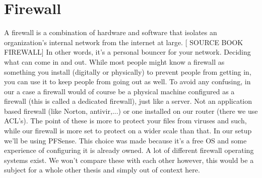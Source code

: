 \section{Firewall}
A firewall is a combination of hardware and software that isolates an organization's internal network from the internet at large. [ SOURCE BOOK FIREWALL] In other words, it's a personal bouncer for your network. Deciding what can come in and out. While most people might know a firewall as something you install (digitally or physically) to prevent people from getting in, you can use it to keep people from going out as well. To avoid any confusing, in our a case a firewall would of course be a physical machine configured as a firewall (this is called a dedicated firewall), just like a server. Not an application based firewall (like Norton, antivir,...) or one installed on our router (there we use ACL's). The point of these is more to protect your files from viruses and such, while our firewall is more set to protect on a wider scale than that. In our setup we'll be using PFSense. This choice was made because it's a free OS and some experience of configuring it is already owned. A lot of different firewall operating systems exist. We won't compare these with each other however, this would be a subject for a whole other thesis and simply out of context here.
